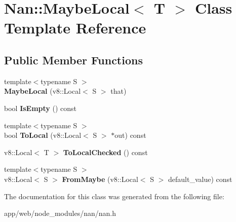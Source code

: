 \hypertarget{class_nan_1_1_maybe_local}{}\section{Nan\+:\+:Maybe\+Local$<$ T $>$ Class Template Reference}
\label{class_nan_1_1_maybe_local}
\subsection*{Public Member Functions}
\begin{DoxyCompactItemize}
\item 
\mbox{\label{class_nan_1_1_maybe_local_ae33a0ceb20c457bfc0eb2f537d268da3}} 
{\footnotesize template$<$typename S $>$ }\\{\bfseries Maybe\+Local} (v8\+::\+Local$<$ S $>$ that)
\item 
\mbox{\label{class_nan_1_1_maybe_local_acb5fe07131afc11fb38a1aa9af6506a6}} 
bool {\bfseries Is\+Empty} () const
\item 
\mbox{\label{class_nan_1_1_maybe_local_a6c4e7e431fb57754ddf2957ffddbcdde}} 
{\footnotesize template$<$typename S $>$ }\\bool {\bfseries To\+Local} (v8\+::\+Local$<$ S $>$ $\ast$out) const
\item 
\mbox{\label{class_nan_1_1_maybe_local_aa780a87dc099da39d90448726cf341db}} 
v8\+::\+Local$<$ T $>$ {\bfseries To\+Local\+Checked} () const
\item 
\mbox{\label{class_nan_1_1_maybe_local_a71726819d090f5b1075168e1aa0976af}} 
{\footnotesize template$<$typename S $>$ }\\v8\+::\+Local$<$ S $>$ {\bfseries From\+Maybe} (v8\+::\+Local$<$ S $>$ default\+\_\+value) const
\end{DoxyCompactItemize}


The documentation for this class was generated from the following file\+:\begin{DoxyCompactItemize}
\item 
app/web/node\+\_\+modules/nan/nan.\+h\end{DoxyCompactItemize}
